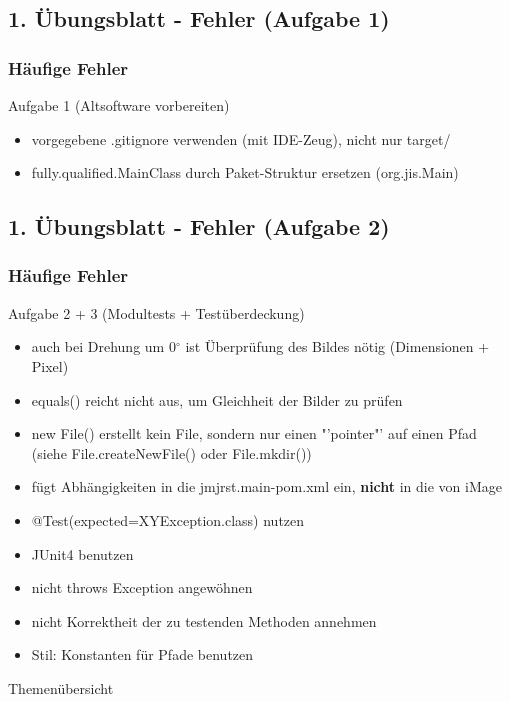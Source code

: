 \documentclass[18pt]{beamer}
\begin{document}
	\subsection{1. Übungsblatt - Fehler (Aufgabe 1)}
	\begin{frame}
		\frametitle{Häufige Fehler}
		\begin{block}{Aufgabe 1 (Altsoftware vorbereiten)}
		\begin{itemize}
			\item vorgegebene .gitignore verwenden (mit IDE-Zeug), nicht nur target/ \pause
			\item fully.qualified.MainClass durch Paket-Struktur ersetzen (org.jis.Main)
		\end{itemize}
		\end{block}
	\end{frame}
	
	\subsection{1. Übungsblatt - Fehler (Aufgabe 2)}
	\begin{frame}
		\frametitle{Häufige Fehler}
		\begin{block}{Aufgabe 2 + 3 (Modultests + Testüberdeckung)}
			\begin{itemize}
				\item auch bei Drehung um 0$^{\circ}$  ist Überprüfung des Bildes nötig (Dimensionen + Pixel) \pause
				\item equals() reicht nicht aus, um Gleichheit der Bilder zu prüfen \pause 
				\item new File() erstellt kein File, sondern nur einen "'pointer"' auf einen Pfad (siehe File.createNewFile() oder File.mkdir()) \pause
				\item fügt Abhängigkeiten in die jmjrst.main-pom.xml ein, \textbf{nicht} in die von iMage \pause
				\item @Test(expected=XYException.class) nutzen \pause
				\item JUnit4 benutzen \pause
				\item nicht throws Exception angewöhnen \pause
				\item nicht Korrektheit der zu testenden Methoden annehmen \pause
				\item Stil: Konstanten für Pfade benutzen
			\end{itemize}
		\end{block}
	\end{frame}

\begin{frame}{Themenübersicht}
\tableofcontents
\end{frame}
\end{document}
